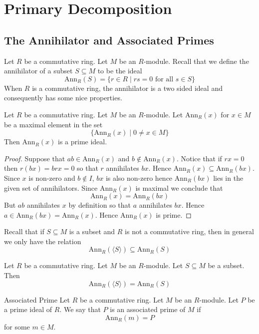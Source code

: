 \documentclass[a4paper]{article}
\begin{document}
\pagebreak
\section{Primary Decomposition}
\subsection{The Annihilator and Associated Primes}
Let $R$ be a commutative ring. Let $M$ be an $R$-module. Recall that we define the annihilator of a subset $S\subseteq M$ to be the ideal $$\text{Ann}_R(S)=\{r\in R\;|\;rs=0\text{ for all }s\in S\}$$ When $R$ is a commutative ring, the annihilator is a two sided ideal and consequently has some nice properties. 

\begin{prp}{}{} Let $R$ be a commutative ring. Let $M$ be an $R$-module. Let $\text{Ann}_R(x)$ for $x\in M$ be a maximal element in the set $$\{\text{Ann}_R(x)\;|\;0\neq x\in M\}$$ Then $\text{Ann}_R(x)$ is a prime ideal. \tcbline
\begin{proof}
Suppose that $ab\in\text{Ann}_R(x)$ and $b\notin\text{Ann}_R(x)$. Notice that if $rx=0$ then $r(bx)=brx=0$ so that $r$ annihilates $bx$. Hence $\text{Ann}_R(x)\subseteq\text{Ann}_R(bx)$. Since $x$ is non-zero and $b\notin I$, $bx$ is also non-zero hence $\text{Ann}_R(bx)$ lies in the given set of annihilators. Since $\text{Ann}_R(x)$ is maximal we conclude that $$\text{Ann}_R(x)=\text{Ann}_R(bx)$$ But $ab$ annihilates $x$ by definition so that $a$ annihilates $bx$. Hence $a\in\text{Ann}_R(bx)=\text{Ann}_R(x)$. Hence $\text{Ann}_R(x)$ is prime. 
\end{proof}
\end{prp}

Recall that if $S\subseteq M$ is a subset and $R$ is not a commutative ring, then in general we only have the relation $$\text{Ann}_R(\langle S\rangle)\subseteq\text{Ann}_R(S)$$

\begin{prp}{}{} Let $R$ be a commutative ring. Let $M$ be an $R$-module. Let $S\subseteq M$ be a subset. Then $$\text{Ann}_R(\langle S\rangle)=\text{Ann}_R(S)$$
\end{prp}

\begin{defn}{Associated Prime}{} Let $R$ be a commutative ring. Let $M$ be an $R$-module. Let $P$ be a prime ideal of $R$. We say that $P$ is an associated prime of $M$ if $$\text{Ann}_R(m)=P$$ for some $m\in M$. 
\end{defn}
\end{document}
